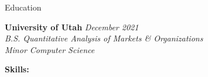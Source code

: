 \documentclass{resume}
\begin{document}
\begin{rSection}{Education}

{\bf University of Utah} \hfill {\em December 2021}
\vspace{2pt}
\emph{
    \\ B.S. Quantitative Analysis of Markets \& Organizations
    \\ Minor Computer Science
}

%
%
%
%
%
%
%   
%
%
%
%

%
%
{\bf Skills:}
\vspace{-1.83em}


\end{rSection}
\end{document}
